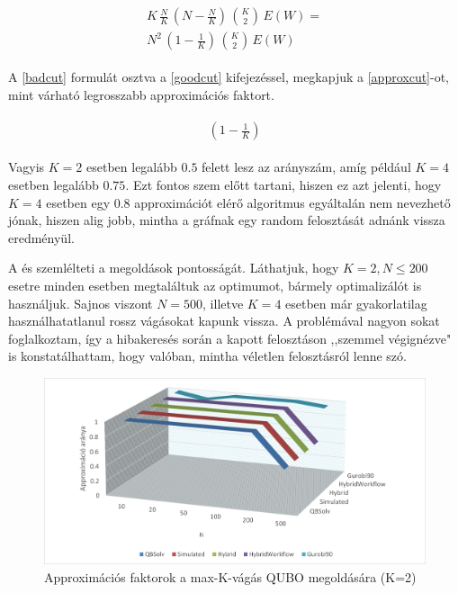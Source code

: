 \begin{align}
	\begin{split}
		K \, \frac{N}{K} \, \left( N-\frac{N}{K} \right) \, \binom{K}{2} \, E(W) = \label{badcut} \\
		 N^2 \, \left( 1 -\frac{1}{K} \right) \,\binom{K}{2} \, E(W)
	\end{split}
\end{align}

A \ref{badcut} formulát osztva a \ref{goodcut} kifejezéssel, megkapjuk a \ref{approxcut}-ot, mint várható legrosszabb approximációs faktort.

\begin{align}
	\begin{split}
		\left( 1 -\frac{1}{K} \right) \label{approxcut}
	\end{split}
\end{align}

Vagyis $K=2$ esetben legalább $0.5$ felett lesz az arányszám, amíg például $K=4$ esetben legalább $0.75$. Ezt fontos szem előtt tartani, hiszen ez azt jelenti, hogy $K=4$ esetben egy $0.8$ approximációt elérő algoritmus egyáltalán nem nevezhető jónak, hiszen alig jobb, mintha a gráfnak egy random felosztását adnánk vissza eredményül.

A  és  szemlélteti a megoldások pontosságát. Láthatjuk, hogy $K=2, N \leq 200$ esetre minden esetben megtaláltuk az optimumot, bármely optimalizálót is használjuk. Sajnos viszont $N=500$, illetve $K=4$ esetben már gyakorlatilag használhatatlanul rossz vágásokat kapunk vissza. A problémával nagyon sokat foglalkoztam, így a hibakeresés során a kapott felosztáson ,,szemmel végignézve" is konstatálhattam, hogy valóban, mintha véletlen felosztásról lenne szó.

\begin{figure}[!ht]
	\centering
	\includegraphics[width=150mm, keepaspectratio]{figures/diagrams/maxKCutQUBO_K2approx.png}
	\caption{Approximációs faktorok a max-K-vágás QUBO megoldására (K=2)}
	\label{fig:maxKCutQUBO_K2approx}
\end{figure}

